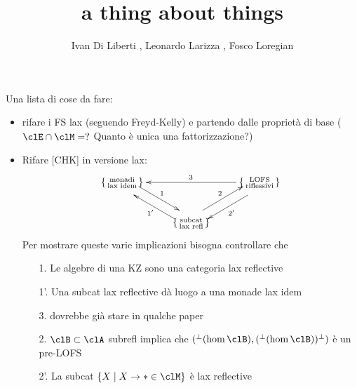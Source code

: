 \documentclass{amsart}
\title{a thing about things}
\author{
    Ivan Di Liberti%
  , Leonardo Larizza%
  , Fosco Loregian%
}
\def\A{\protect{\{\begin{smallmatrix}
  \text{monadi}\\
  \text{lax idem}
\end{smallmatrix}\}}}
\def\B{\protect{\{\begin{smallmatrix}
  \text{LOFS}\\
  \text{riflessivi}
\end{smallmatrix}\} }}
\def\C{\protect{\{\begin{smallmatrix}
  \text{subcat}\\
  \text{lax refl}
\end{smallmatrix} \} }}
\begin{document}
\maketitle
Una lista di cose da fare:
\begin{itemize}
  \item rifare i FS lax (seguendo Freyd-Kelly) e partendo dalle proprietà di base ($\clE\cap \clM = ?$ Quanto è unica una fattorizzazione?)
  \item Rifare [CHK] in versione lax: 
  \[
  \xymatrix{
    \A \ar@<5pt>[dr]^1 && \ar[ll]_{3} \B \ar@<5pt>[dl]^{2'} \\
     & \C \ar@<5pt>[ur]^2 \ar@<5pt>[ul]^{1'} &
  }  
  \]  
  Per mostrare queste varie implicazioni bisogna controllare che
  \begin{itemize}
  \item[1.] Le algebre di una KZ sono una categoria lax reflective
  \item[1'.] Una subcat lax reflective dà luogo a una monade lax idem
  \item[3.] dovrebbe già stare in qualche paper
  \item[2.] $\clB\subset\clA$ subrefl implica che $({}^\perp(\hom \clB), ({}^\perp(\hom\clB))^\perp)$ è un pre-LOFS
  \item[2'.] La subcat $\{X \mid X \to * \in \clM\}$ è lax reflective
  \end{itemize}
\end{itemize}
\hrulefill
\end{document}
